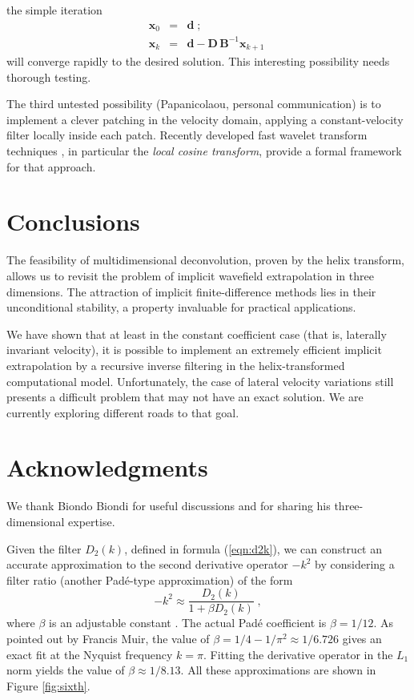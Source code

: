 the simple iteration
\begin{eqnarray}
  \label{ralg}
  \mathbf{x}_0 & = & \mathbf{d}\;; \\
  \mathbf{x}_k & = & \mathbf{d} - \mathbf{D}\,\mathbf{B}^{-1} \mathbf{x}_{k+1}\;
\end{eqnarray}
will converge rapidly to the desired solution. This interesting
possibility needs thorough testing.
\par
The third untested possibility (Papanicolaou, personal communication)
is to implement a clever patching in the velocity domain, applying a
constant-velocity filter locally inside each patch. Recently developed
fast wavelet transform techniques \cite[]{wavelet}, in particular the
\emph{local cosine transform}, provide a formal framework for that
approach.

\section{Conclusions}

The feasibility of multidimensional deconvolution, proven by the
helix transform, allows us to revisit the problem of implicit
wavefield extrapolation in three dimensions. The attraction of
implicit finite-difference methods lies in their unconditional
stability, a property invaluable for practical applications.
\par
We have shown that at least in the constant coefficient case (that is,
laterally invariant velocity), it is possible to implement an
extremely efficient implicit extrapolation by a recursive inverse
filtering in the helix-transformed computational model. Unfortunately,
the case of lateral velocity variations still presents a difficult
problem that may not have an exact solution. We are currently
exploring different roads to that goal.

\section{Acknowledgments}

We thank Biondo Biondi for useful discussions and for sharing his
three-dimensional expertise.




Given the filter $D_2 (k)$, defined in formula (\ref{eqn:d2k}), we can
construct an accurate approximation to the second derivative operator
$-k^2$ by considering a filter ratio (another Pad\'{e}-type
approximation) of the form
\begin{equation}
  \label{eqn:ratio}
  -k^2 \approx \frac{D_2(k)}{1 + \beta D_2 (k)}\;,
\end{equation}
where $\beta$ is an adjustable constant \cite[]{Claerbout.blackwell.85}.
The actual Pad\'{e} coefficient is $\beta=1/12$.  As pointed out by
Francis Muir, the value of $\beta = 1/4 - 1/\pi^2 \approx 1/6.726$
gives an exact fit at the Nyquist frequency $k = \pi$. Fitting the
derivative operator in the $L_1$ norm yields the value of $\beta
\approx 1/8.13$. All these approximations are shown in Figure
\ref{fig:sixth}.

